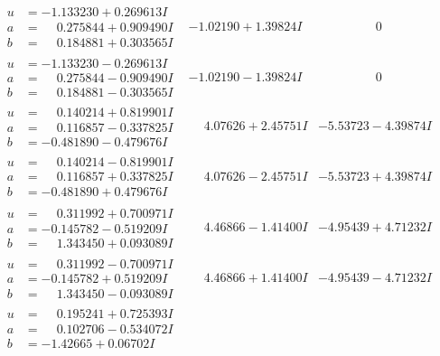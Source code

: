 \documentclass[1p]{elsarticle_modified}
\theoremstyle{definition}
\begin{document}
$$\begin{array}{c|c|c}
\begin{aligned}
u &= -1.133230 + 0.269613 I \\
a &= \phantom{-}0.275844 + 0.909490 I \\
b &= \phantom{-}0.184881 + 0.303565 I\end{aligned}
 & -1.02190 + 1.39824 I & \phantom{-0.000000 } 0 \\ \hline\begin{aligned}
u &= -1.133230 - 0.269613 I \\
a &= \phantom{-}0.275844 - 0.909490 I \\
b &= \phantom{-}0.184881 - 0.303565 I\end{aligned}
 & -1.02190 - 1.39824 I & \phantom{-0.000000 } 0 \\ \hline\begin{aligned}
u &= \phantom{-}0.140214 + 0.819901 I \\
a &= \phantom{-}0.116857 - 0.337825 I \\
b &= -0.481890 - 0.479676 I\end{aligned}
 & \phantom{-}4.07626 + 2.45751 I & -5.53723 - 4.39874 I \\ \hline\begin{aligned}
u &= \phantom{-}0.140214 - 0.819901 I \\
a &= \phantom{-}0.116857 + 0.337825 I \\
b &= -0.481890 + 0.479676 I\end{aligned}
 & \phantom{-}4.07626 - 2.45751 I & -5.53723 + 4.39874 I \\ \hline\begin{aligned}
u &= \phantom{-}0.311992 + 0.700971 I \\
a &= -0.145782 - 0.519209 I \\
b &= \phantom{-}1.343450 + 0.093089 I\end{aligned}
 & \phantom{-}4.46866 - 1.41400 I & -4.95439 + 4.71232 I \\ \hline\begin{aligned}
u &= \phantom{-}0.311992 - 0.700971 I \\
a &= -0.145782 + 0.519209 I \\
b &= \phantom{-}1.343450 - 0.093089 I\end{aligned}
 & \phantom{-}4.46866 + 1.41400 I & -4.95439 - 4.71232 I \\ \hline\begin{aligned}
u &= \phantom{-}0.195241 + 0.725393 I \\
a &= \phantom{-}0.102706 - 0.534072 I \\
b &= -1.42665 + 0.06702 I\end{aligned}

\end{array}$$
\end{document}
